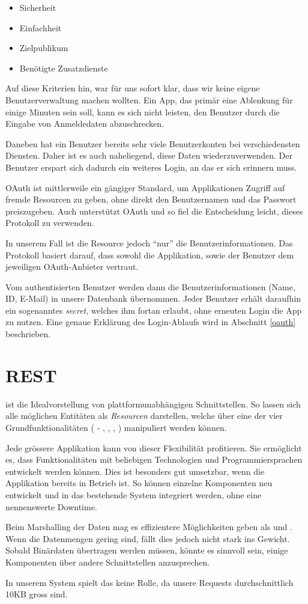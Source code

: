 \begin{itemize}
\item Sicherheit
\item Einfachheit
\item Zielpublikum
\item Benötigte Zusatzdienste
\end{itemize}

Auf diese Kriterien hin, war für uns sofort klar, dass wir keine eigene Benutzerverwaltung machen wollten.
Ein App, das primär eine Ablenkung für einige Minuten sein soll, kann es sich nicht leisten, den Benutzer durch die Eingabe von Anmeldedaten abzuschrecken.

Daneben hat ein Benutzer bereits sehr viele Benutzerkonten bei verschiedensten Diensten.
Daher ist es auch naheliegend, diese Daten wiederzuverwenden.
Der Benutzer erspart sich dadurch ein weiteres Login, an das er sich erinnern muss.

\Gls{OAuth} ist mittlerweile ein gängiger Standard, um Applikationen Zugriff auf fremde Resourcen zu geben, ohne direkt den Benutzernamen und das Passwort preiszugeben.
Auch  unterstützt \gls{OAuth} und so fiel die Entscheidung leicht, dieses Protokoll zu verwenden.

In unserem Fall ist die Resource jedoch "`nur"' die Benutzerinformationen.
Das Protokoll basiert darauf, dass sowohl die Applikation, sowie der Benutzer dem jeweiligen \gls{OAuth}-Anbieter vertraut.

Vom authentisierten Benutzer werden dann die Benutzerinformationen (Name, ID, E-Mail) in unsere Datenbank übernommen.
Jeder Benutzer erhält daraufhin ein sogenanntes \emph{secret}, welches ihm fortan erlaubt, ohne erneuten Login die App zu nutzen.
Eine genaue Erklärung des Login-Ablaufs wird in Abschnitt \ref{oauth} beschrieben.

\section{REST}
 ist die Idealvorstellung von plattformunabhängigen Schnittstellen.
So lassen sich alle möglichen Entitäten als \emph{Resourcen} darstellen, welche über eine der vier Grundfunktionalitäten ( - , , , ) manipuliert werden können.

Jede grössere Applikation kann von dieser Flexibilität profitieren.
Sie ermöglicht es, dass Funktionalitäten mit beliebigen Technologien und Programmiersprachen entwickelt werden können.
Dies ist besonders gut umsetzbar, wenn die Applikation bereits in Betrieb ist.
So können einzelne Komponenten neu entwickelt und in das bestehende System integriert werden, ohne eine nennenswerte Downtime.

Beim \gls{Marshalling} der Daten mag es effizientere Möglichkeiten geben als  und .
Wenn die Datenmengen gering sind, fällt dies jedoch nicht stark ins Gewicht.
Sobald Binärdaten übertragen werden müssen, könnte es sinnvoll sein, einige Komponenten über andere Schnittstellen anzusprechen.

In unserem System spielt das keine Rolle, da unsere Requests durchschnittlich 10KB gross sind.
